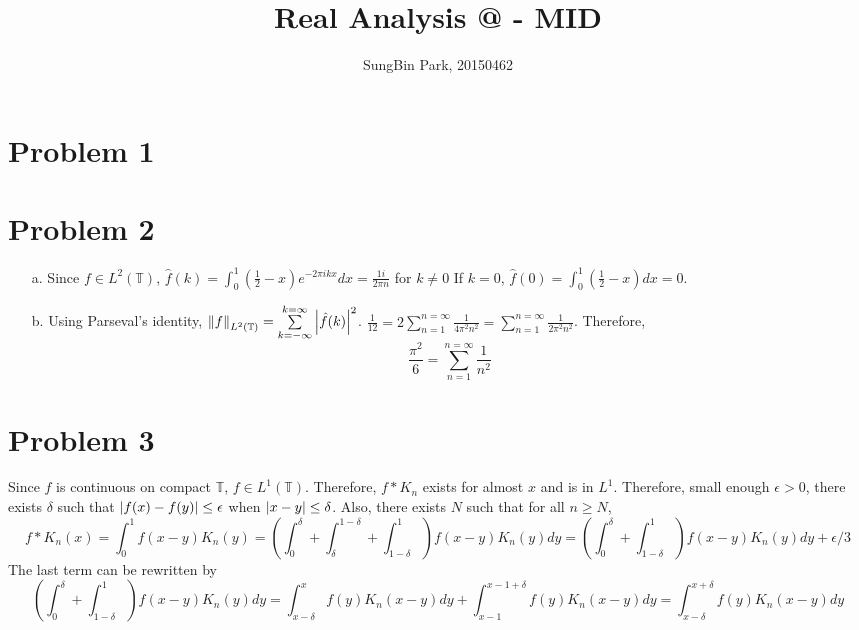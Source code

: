 \documentclass{article}
\makeatletter
\newcommand*{\rom}[1]{\expandafter\@slowromancap\romannumeral #1@}
\makeatother
\begin{document}
\title{Real Analysis \rom{2} - MID}
\author{SungBin Park, 20150462} 

\maketitle

\section*{Problem 1}

\section*{Problem 2}
\begin{enumerate}
\item[a.] Since $f\in L^2(\mathbb{T})$, $\hat{f}(k)=\int_0^1 \left(\frac{1}{2}-x\right) e^{-2\pi ik x} dx=\frac{1 i}{2\pi n}$ for $k\neq 0$ If $k=0$, $\hat{f}(0)=\int_0^1 \left(\frac{1}{2}-x\right) dx = 0$.
\item[b.] Using Parseval's identity, $\norm{f}_{L^2(\mathbb{T})}=\sum\limits_{k=-\infty}^{k=\infty} \abs{\hat{f}(k)}^2$. $\frac{1}{12}=2\sum\limits_{n=1}^{n=\infty} \frac{1}{4\pi^2 n^2} = \sum\limits_{n=1}^{n=\infty} \frac{1}{2\pi^2 n^2}$. Therefore,
\begin{equation*}
\frac{\pi^2}{6}=\sum\limits_{n=1}^{n=\infty} \frac{1}{n^2}
\end{equation*}
\end{enumerate}
\section*{Problem 3}
Since $f$ is continuous on compact $\mathbb{T}$, $f\in L^1(\mathbb{T})$. Therefore, $f* K_n$ exists for almost $x$ and is in $L^1$. Therefore, small enough $\epsilon>0$, there exists $\delta$ such that $\abs{f(x)-f(y)}\leq \epsilon$ when $\abs{x-y}\leq \delta$. Also, there exists $N$ such that for all $n\geq N$,
\begin{equation*}
f * K_n(x)=\int_0^1 f(x-y)K_n(y) = \left(\int_0^\delta + \int_\delta^{1-\delta} + \int_{1-\delta}^1\right) f(x-y)K_n(y) dy=  \left(\int_0^\delta + \int_{1-\delta}^1\right) f(x-y)K_n(y) dy+\epsilon/3
\end{equation*}
The last term can be rewritten by
\begin{equation*}
\left(\int_0^\delta + \int_{1-\delta}^1\right) f(x-y)K_n(y) dy = \int_{x-\delta}^x f(y) K_n(x-y) dy +\int_{x-1}^{x-1+\delta} f(y) K_n(x-y)dy = \int_{x-\delta}^{x+\delta} f(y) K_n(x-y) dy
\end{equation*}
\end{document}
